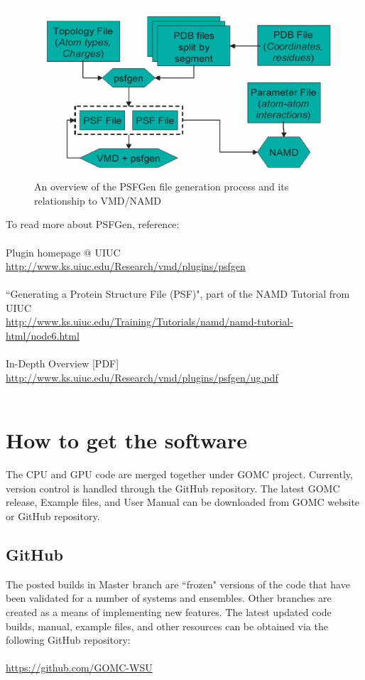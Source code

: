 \begin{figure}[H]
\centering
\includegraphics[scale=0.6]{images/psfgen}
\caption{An overview of the PSFGen file generation process and its relationship to VMD/NAMD}
\end{figure}
To read more about PSFGen, reference:\\\\
Plugin homepage @ UIUC\\
\url{http://www.ks.uiuc.edu/Research/vmd/plugins/psfgen}\\\\
``Generating a Protein Structure File (PSF)", part of the NAMD Tutorial from UIUC\\
\url{http://www.ks.uiuc.edu/Training/Tutorials/namd/namd-tutorial-html/node6.html}\\\\
In-Depth Overview [PDF]\\
\url{http://www.ks.uiuc.edu/Research/vmd/plugins/psfgen/ug.pdf}\\\\


\section{How to get the software}
The CPU and GPU code are merged together under GOMC project. Currently, version control is handled through the GitHub repository. The latest GOMC release, Example files, and User Manual can be downloaded from GOMC website or GitHub repository.

\subsection{GitHub}
The posted builds in Master branch are ``frozen" versions of the code that have been validated for a number of systems and ensembles. Other branches are created as a means of implementing new features. The latest updated code builds, manual, example files, and other resources can be obtained via the following GitHub repository:\\\\
\url{https://github.com/GOMC-WSU}


